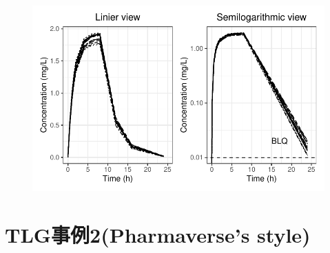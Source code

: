 \documentclass[
  letterpaper,
  DIV=11,
  numbers=noendperiod]{scrreprt}
\begin{document}
\begin{figure}[H]

{\centering \includegraphics{output_flow_files/figure-pdf/nca3-2.pdf}

}

\end{figure}


\hypertarget{tlgux4e8bux4f8b2pharmaverses-style}{%
\chapter{TLG事例2(Pharmaverse's
style)}\label{tlgux4e8bux4f8b2pharmaverses-style}}
\end{document}
